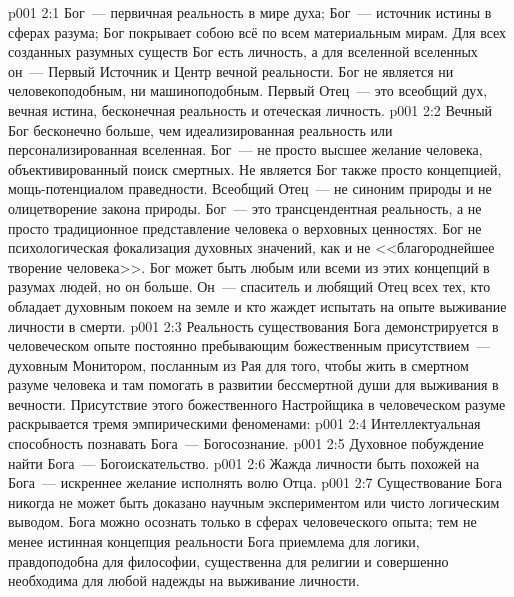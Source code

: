 \vs p001 2:1 Бог~--- первичная реальность в мире духа; Бог~--- источник истины в сферах разума; Бог покрывает собою всё по всем материальным мирам. Для всех созданных разумных существ Бог есть личность, а для вселенной вселенных он~--- Первый Источник и Центр вечной реальности. Бог не является ни человекоподобным, ни машиноподобным. Первый Отец~--- это всеобщий дух, вечная истина, бесконечная реальность и отеческая личность.
\vs p001 2:2 \pc Вечный Бог бесконечно больше, чем идеализированная реальность или персонализированная вселенная. Бог~--- не просто высшее желание человека, объективированный поиск смертных. Не является Бог также просто концепцией, мощь\hyp{}потенциалом праведности. Всеобщий Отец~--- не синоним природы и не олицетворение закона природы. Бог~--- это трансцендентная реальность, а не просто традиционное представление человека о верховных ценностях. Бог не психологическая фокализация духовных значений, как и не <<благороднейшее творение человека>>. Бог может быть любым или всеми из этих концепций в разумах людей, но он больше. Он~--- спаситель и любящий Отец всех тех, кто обладает духовным покоем на земле и кто жаждет испытать на опыте выживание личности в смерти.
\vs p001 2:3 \pc Реальность существования Бога демонстрируется в человеческом опыте постоянно пребывающим божественным присутствием~--- духовным Монитором, посланным из Рая для того, чтобы жить в смертном разуме человека и там помогать в развитии бессмертной души для выживания в вечности. Присутствие этого божественного Настройщика в человеческом разуме раскрывается тремя эмпирическими феноменами:
\vs p001 2:4 Интеллектуальная способность познавать Бога~--- Богосознание.
\vs p001 2:5 Духовное побуждение найти Бога~--- Богоискательство.
\vs p001 2:6 Жажда личности быть похожей на Бога~--- искреннее желание исполнять волю Отца.
\vs p001 2:7 \pc Существование Бога никогда не может быть доказано научным экспериментом или чисто логическим выводом. Бога можно осознать только в сферах человеческого опыта; тем не менее истинная концепция реальности Бога приемлема для логики, правдоподобна для философии, существенна для религии и совершенно необходима для любой надежды на выживание личности.
